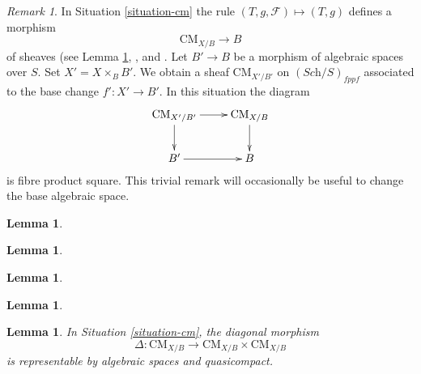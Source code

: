 \documentclass{stacks-project}
\theoremstyle{plain}
\newtheorem{lemma}[subsection]{Lemma}
\theoremstyle{definition}
\theoremstyle{remark}
\newtheorem{remark}[subsection]{Remark}
\numberwithin{equation}{subsection}
\def\Sch{\textit{Sch}}
\def\CMfunctor{\mathcal{C}\!{\it oh}}
\def\CMfunctor{\text{CM}}
\begin{document}
\begin{remark}
	\label{remark-cm-base-change}
	In Situation \ref{situation-cm} the rule
$(T, g, \mathcal{F}) \mapsto (T, g)$ defines a morphism
$$
\CMfunctor_{X/B} \longrightarrow B
$$
of sheaves
(see Lemma \ref{lemma-coherent-stack},
\cite[Tag 04SU]{stacks-project}, and
\cite[Tag 0305]{stacks-project}.
Let $B' \to B$ be a morphism of
algebraic spaces over $S$.
Set $X' = X \times_B B'$.
We obtain a sheaf $\CMfunctor_{X'/B'}$ on  $(\Sch/S)_{fppf}$
associated to the base change $f' : X' \to B'$. In this situation
the diagram
$$
\vcenter{
\xymatrix{
\CMfunctor_{X'/B'} \ar[r] \ar[d] & \CMfunctor_{X/B} \ar[d] \\
B' \ar[r] & B
}
}
$$
is fibre product square. This trivial remark
will occasionally be useful to change the base algebraic space.
\end{remark}
\begin{lemma}
	
	\label{lemma-sm-stack}
\end{lemma}
\begin{lemma}
	
	\label{lemma-cm-limits}
\end{lemma}
\begin{lemma}
	
	\label{lemma-cm-RS-star}
\end{lemma}
\begin{lemma}
	
	\label{lemma-coherent-stack}
\end{lemma}
\begin{lemma}
	In Situation \ref{situation-cm}, the diagonal morphism 
	\[\Delta:\CMfunctor_{X/B}\rightarrow\CMfunctor_{X/B}\times\CMfunctor_{X/B}\]
	is representable by algebraic spaces and quasicompact.
	\label{cm-rep-diagonal}
\end{lemma}
\end{document}
